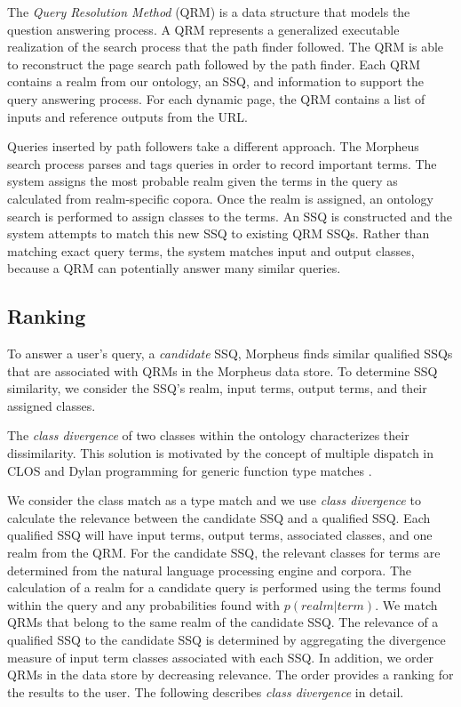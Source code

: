 The \emph{Query Resolution Method} (QRM) is a data structure that models the question answering process. A QRM represents a generalized executable realization of the search process that the path finder followed. The QRM is able to reconstruct the page search path followed by the path finder. Each QRM contains a realm from our ontology, an SSQ, and information to support the query answering process. For each dynamic page, the QRM contains a list of inputs and reference outputs from the URL.


Queries inserted by path followers take a different approach. The Morpheus search process parses and tags queries in order to record important terms. The system assigns the most probable realm given the terms in the query as calculated from realm-specific copora. Once the realm is assigned, an ontology search is performed to assign classes to the terms. An SSQ is constructed and the system attempts to match this new SSQ to existing QRM SSQs. Rather than matching exact query terms, the system matches input and output classes, because a QRM can potentially answer many similar queries.


\subsection{Ranking} 
\label{sec:qrm_ranking}

To answer a user's query, a \emph{candidate} SSQ, Morpheus finds similar qualified SSQs that are associated with QRMs in the Morpheus data store.  To determine SSQ similarity, we consider the SSQ's realm, input terms, output terms, and their assigned classes. 

The \emph{class divergence} of two classes within the ontology characterizes their dissimilarity.  This solution is motivated by the concept of multiple dispatch in CLOS and Dylan programming for generic function type matches \cite{Barrett1996}. 

We consider the class match as a type match and we use \emph{class divergence} to calculate the relevance between the candidate SSQ and a qualified SSQ. Each qualified SSQ will have input terms, output terms, associated classes, and one realm from the QRM.  For the candidate SSQ, the relevant classes for terms are determined from the natural language processing engine and corpora. The calculation of a realm for a candidate query is performed using the terms found within the query and any probabilities found with $p(realm|term)$. %
We match QRMs that belong to the same realm of the candidate SSQ. The relevance of a qualified SSQ to the candidate SSQ is determined by aggregating the divergence measure of input term classes associated with each SSQ. In addition, we order QRMs in the data store by decreasing relevance. The order provides a ranking for the results to the user. The following describes \emph{class divergence} in detail.

